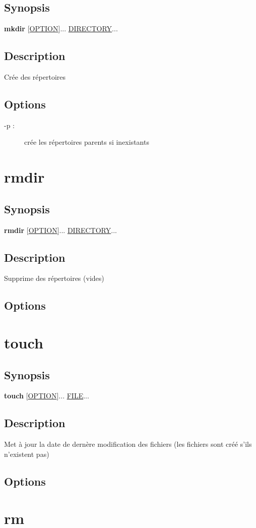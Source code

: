 \documentclass[a4paper, 10pt, onecolumn, openright, oneside]{book}
\begin{document}
			\subsection{Synopsis}
				\textbf{mkdir} [\ul{OPTION}]... \ul{DIRECTORY}...
			\subsection{Description}
				Crée des répertoires
			\subsection{Options}
				\begin{description}
				\item[-p :] crée les répertoires parents si inexistants
				\end{description}
		\section{rmdir}
			\subsection{Synopsis}
				\textbf{rmdir} [\ul{OPTION}]... \ul{DIRECTORY}...
			\subsection{Description}
				Supprime des répertoires (vides)
			\subsection{Options}
		\section{touch}
			\subsection{Synopsis}
				\textbf{touch} [\ul{OPTION}]... \ul{FILE}...
			\subsection{Description}
				Met à jour la date de dernère modification des fichiers (les fichiers sont créé s'ils n'existent pas)
			\subsection{Options}
		\section{rm}
\end{document}

